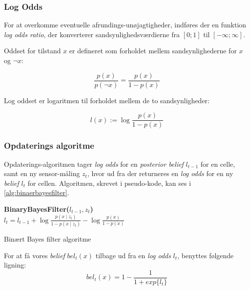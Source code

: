 \subsubsection{Log Odds}
For at overkomme eventuelle afrundings-unøjagtigheder, indføres der en funktion \textit{log odds ratio}, der konverterer sandsynlighedsværdierne fra $[0;1]$ til $[-\infty;\infty]$.

Oddset for tilstand $x$ er defineret som forholdet mellem sandsynlighederne for $x$ og $\lnot x$:

\begin{equation}
\frac{p(x)}{p(\lnot x)} = \frac{p(x)}{1 - p(x)}
\end{equation}

Log oddset er logaritmen til forholdet mellem de to sandsynligheder:

\begin{equation}
l(x) := \log \frac{p(x)}{1 - p(x)}
\end{equation}

\subsubsection{Opdaterings algoritme}
Opdaterings-algoritmen tager \textit{log odds} for en \textit{posterior belief} $l_{t-1}$ for en celle, samt en ny sensor-måling $z_t$, hvor ud fra der returneres en \textit{log odds} for en ny \textit{belief} $l_t$ for cellen.
Algoritmen, skrevet i pseudo-kode, kan ses i \cref{alg:binaerbayesfilter}.

\begin{algorithm}[h]
\textbf{BinaryBayesFilter($l_{t-1}, z_t$)} \\
\Indp $l_t = l_{t-1} + \log \frac{p(x \mid z_t)}{1-p(x \mid z_t)} - \log \frac{p(x)}{1-p(x)}$ \\
\caption{Binært Bayes filter algoritme}
\label{alg:binaerbayesfilter}
\end{algorithm}


For at få vores \textit{belief} $bel_t(x)$ tilbage ud fra en \textit{log odds} $l_t$, benyttes følgende ligning:
\begin{equation}
bel_t(x) = 1 - \frac{1}{1 + exp\{l_t\}}
\end{equation}

